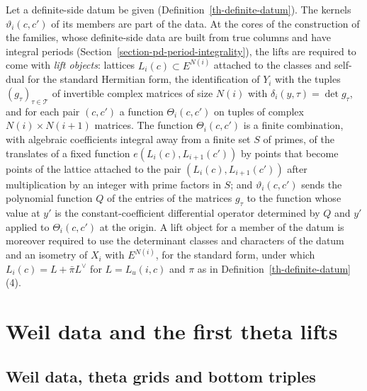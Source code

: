 \begin{remark}\label{th-lift-kernels}
Let a definite-side datum be given (Definition~\ref{th-definite-datum}). The
kernels $\vartheta_i(c,c')$ of its members are part of the data. At the cores
of the construction of the families, whose definite-side data are built from
true columns and have integral periods
(Section~\ref{section-pd-period-integrality}),
the lifts are required to come with \emph{lift objects}: lattices
$L_i(c)\subset E^{N(i)}$ attached to the classes and self-dual for the standard
Hermitian form,
the identification of $Y_i$ with the tuples $(g_\tau)_{\tau\in\mathcal T}$ of
invertible complex matrices of size $N(i)$ with $\delta_i(y,\tau)=\det g_\tau$,
and for each pair $(c,c')$ a function $\Theta_i(c,c')$ on tuples of complex
$N(i)\times N(i+1)$ matrices. The function $\Theta_i(c,c')$ is a finite
combination, with algebraic coefficients integral away from a finite set $S$
of primes, of the translates of a fixed function $e(L_i(c),L_{i+1}(c'))$ by
points that become points of the lattice attached to the pair
$(L_i(c),L_{i+1}(c'))$ after multiplication by an integer with prime factors
in $S$; and $\vartheta_i(c,c')$ sends the polynomial
function $Q$ of the entries of the matrices $g_\tau$ to the function whose value at $y'$
is the constant-coefficient differential operator determined by $Q$ and $y'$
applied to $\Theta_i(c,c')$ at the origin. A lift object for a member of the
datum is moreover required to use the determinant classes and characters of
the datum and an isometry of $X_i$ with $E^{N(i)}$, for the standard form,
under which $L_i(c)=L+\bar\pi L^\vee$ for $L=L_u(i,c)$ and $\pi$ as in
Definition~\ref{th-definite-datum}(4).
\end{remark}

\section{Weil data and the first theta lifts}\label{section-th-weil}

\subsection{Weil data, theta grids and bottom triples}\label{subsection-th-weil-grids}

